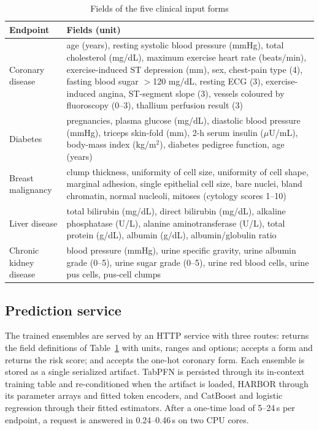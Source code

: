 \begin{table}[!t]
\caption{Fields of the five clinical input forms}
\label{tab:forms}
\centering\footnotesize
\begin{tabular}{@{}lp{}@{}}
\toprule
Endpoint & Fields (unit)\\
\midrule
Coronary disease & age (years), resting systolic blood pressure (mmHg), total cholesterol (mg/dL), maximum exercise heart rate (beats/min), exercise-induced ST depression (mm), sex, chest-pain type (4), fasting blood sugar $>$120 mg/dL, resting ECG (3), exercise-induced angina, ST-segment slope (3), vessels coloured by fluoroscopy (0--3), thallium perfusion result (3)\\
Diabetes & pregnancies, plasma glucose (mg/dL), diastolic blood pressure (mmHg), triceps skin-fold (mm), 2-h serum insulin ($\mu$U/mL), body-mass index (kg/m$^2$), diabetes pedigree function, age (years)\\
Breast malignancy & clump thickness, uniformity of cell size, uniformity of cell shape, marginal adhesion, single epithelial cell size, bare nuclei, bland chromatin, normal nucleoli, mitoses (cytology scores 1--10)\\
Liver disease & total bilirubin (mg/dL), direct bilirubin (mg/dL), alkaline phosphatase (U/L), alanine aminotransferase (U/L), total protein (g/dL), albumin (g/dL), albumin/globulin ratio\\
Chronic kidney disease & blood pressure (mmHg), urine specific gravity, urine albumin grade (0--5), urine sugar grade (0--5), urine red blood cells, urine pus cells, pus-cell clumps\\
\bottomrule
\end{tabular}
\end{table}

\subsection{Prediction service}
The trained ensembles are served by an HTTP service with three routes:  returns the field definitions of Table~\ref{tab:forms} with units, ranges and options;  accepts a form and returns the risk score; and  accepts the one-hot coronary form. Each ensemble is stored as a single serialized artifact. TabPFN is persisted through its in-context training table and re-conditioned when the artifact is loaded, HARBOR through its parameter arrays and fitted token encoders, and CatBoost and logistic regression through their fitted estimators. After a one-time load of 5--24\,s per endpoint, a request is answered in 0.24--0.46\,s on two CPU cores.

